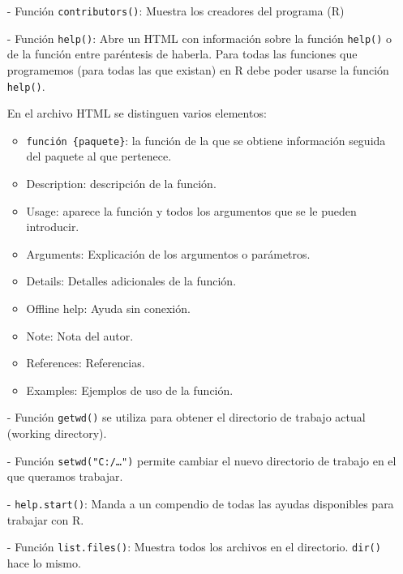 \documentclass[a4paper, 12pt]{article}
\begin{document}
	\begin{itemize}
		\item[-]Función \texttt{contributors()}: Muestra los creadores del programa (R)
		
		\item[-]Función \texttt{help()}: Abre un HTML con información sobre la función \texttt{help()} o de la función entre paréntesis de haberla. Para todas las funciones que programemos (para todas las que existan) en R debe poder usarse la función \texttt{help()}.
		
		En el archivo HTML se distinguen varios elementos:
		
		\begin{itemize}
			\item \texttt{función \{paquete\}}: la función de la que se obtiene información seguida del paquete al que pertenece.
			\item Description: descripción de la función.
			\item Usage: aparece la función y todos los argumentos que se le pueden introducir.
			\item Arguments: Explicación de los argumentos o parámetros.
			\item Details: Detalles adicionales de la función.
			\item Offline help: Ayuda sin conexión.
			\item Note: Nota del autor.
			\item References: Referencias.
			\item Examples: Ejemplos de uso de la función.
		\end{itemize}
		
		\item[-]Función \texttt{getwd()} se utiliza para obtener el directorio de trabajo actual (working directory).
		
		\item[-]Función \texttt{setwd(\string"C:/…")} permite cambiar el nuevo directorio de trabajo en el que queramos trabajar.
		
		\item[-] \texttt{help.start()}: Manda a un compendio de todas las ayudas disponibles para trabajar con R.
		
		\item[-]Función \texttt{list.files()}: Muestra todos los archivos en el directorio. \texttt{dir()} hace lo mismo. 
	\end{itemize}
	
	\newpage
	
\end{document}
